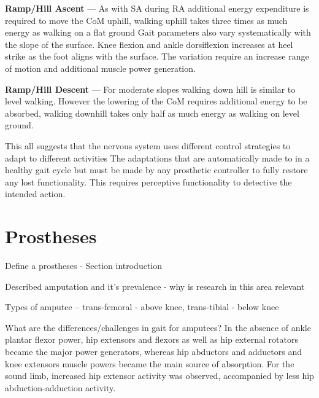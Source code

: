 \textbf{Ramp/Hill Ascent} --- As with SA during RA additional energy expenditure is required to move the CoM uphill\cite{Franz2012a}, walking uphill takes three times as much energy as walking on a flat ground\cite{Matsumoto2017} Gait parameters also vary systematically with the slope of the surface\cite{Kimel-Naor2017}. Knee flexion and ankle dorsiflexion increases at heel strike as the foot aligns with the surface. The variation require an increase range of motion and additional muscle power generation.\cite{McIntosh2006}

\textbf{Ramp/Hill Descent} --- For moderate slopes walking down hill is similar to level walking. However the lowering of the CoM requires additional energy to be absorbed\cite{Franz2012a}, walking downhill takes only half as much energy as walking on level ground\cite{Matsumoto2017}.

This all suggests that the nervous system uses different control strategies to adapt to different activities\cite{Lay2007} The adaptations that are automatically made to in a healthy gait cycle but must be made by any prosthetic controller to fully restore any lost functionality. This requires perceptive functionality to detective the intended action.



\section{Prostheses}
Define a prostheses - Section introduction

Described amputation and it's prevalence - why is research in this area relevant 

Types of amputee -- trans-femoral - above knee, trans-tibial - below knee

What are the differences/challenges in gait for amputees? 
In the absence of ankle plantar flexor power, hip extensors and flexors as well as hip external rotators became the major power generators, whereas hip abductors and adductors and knee extensors muscle powers became the main source of absorption. For the sound limb, increased hip extensor activity was observed, accompanied by less hip abduction-adduction activity.\cite{Sadeghi2001}


